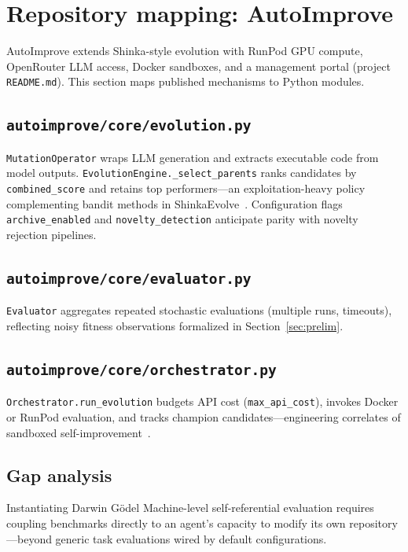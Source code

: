 \section{Repository mapping: AutoImprove}
\label{sec:auto}

AutoImprove extends Shinka-style evolution with RunPod GPU compute, OpenRouter LLM access, Docker sandboxes, and a management portal (project \texttt{README.md}).
This section maps published mechanisms to Python modules.

\subsection{\texttt{autoimprove/core/evolution.py}}
\texttt{MutationOperator} wraps LLM generation and extracts executable code from model outputs.
\texttt{EvolutionEngine.\_select\_parents} ranks candidates by \texttt{combined\_score} and retains top performers---an exploitation-heavy policy complementing bandit methods in ShinkaEvolve~\cite{lange2025shinka}.
Configuration flags \texttt{archive\_enabled} and \texttt{novelty\_detection} anticipate parity with novelty rejection pipelines.

\subsection{\texttt{autoimprove/core/evaluator.py}}
\texttt{Evaluator} aggregates repeated stochastic evaluations (multiple runs, timeouts), reflecting noisy fitness observations formalized in Section~\ref{sec:prelim}.

\subsection{\texttt{autoimprove/core/orchestrator.py}}
\texttt{Orchestrator.run\_evolution} budgets API cost (\texttt{max\_api\_cost}), invokes Docker or RunPod evaluation, and tracks champion candidates---engineering correlates of sandboxed self-improvement~\cite{zhang2025darwin}.

\subsection{Gap analysis}
Instantiating Darwin G\"odel Machine-level self-referential evaluation requires coupling benchmarks directly to an agent's capacity to modify its own repository---beyond generic task evaluations wired by default configurations.
